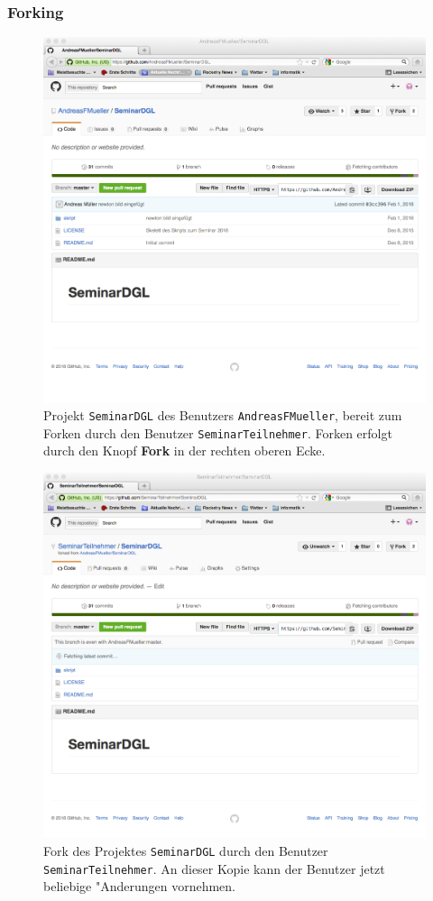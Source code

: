 \documentclass[a4paper,12pt]{article}
\begin{document}
\subsubsection{Forking}
\begin{figure}
\centering
\includegraphics[width=\hsize]{fork.png}
\caption{Projekt \texttt{SeminarDGL} des Benutzers \texttt{AndreasFMueller},
bereit zum Forken durch den Benutzer \texttt{SeminarTeilnehmer}.
Forken erfolgt durch den Knopf {\bf Fork} in der rechten oberen Ecke.
\label{fork}}
\end{figure}
\begin{figure}
\centering
\includegraphics[width=\hsize]{forked.png}
\caption{Fork des Projektes \texttt{SeminarDGL} durch den Benutzer
\texttt{SeminarTeilnehmer}.
An dieser Kopie kann der Benutzer jetzt beliebige "Anderungen vornehmen.
\label{forked}}
\end{figure}
\end{document}
